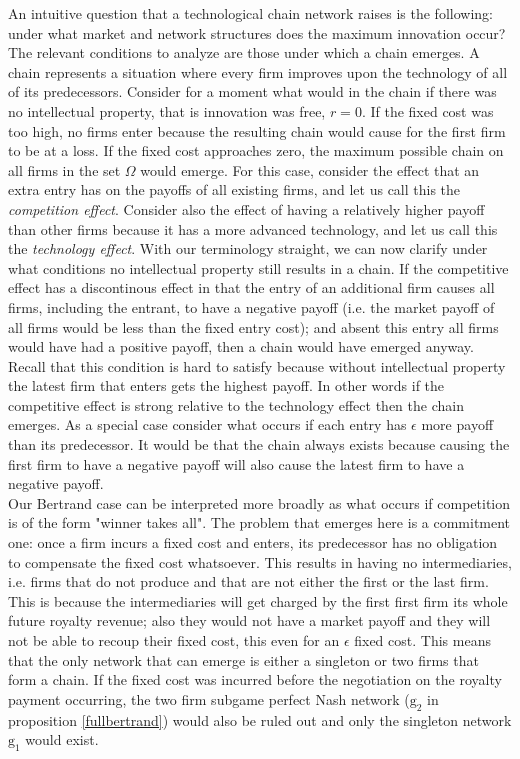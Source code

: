 \documentclass{article}
\begin{document}
\indent An intuitive question that a technological chain network raises is the following: under what market and network structures does the maximum innovation occur? The relevant conditions to analyze are those under which a chain emerges. A chain represents a situation where every firm improves upon the technology of all of its predecessors. Consider for a moment what would in the chain if there was no intellectual property, that is innovation was free, $r=0$. If the fixed cost was too high, no firms enter because the resulting chain would cause for the first firm to be at a loss. If the fixed cost approaches zero, the maximum possible chain on all firms in the set $\Omega$ would emerge. For this case, consider the effect that an extra entry has on the payoffs of all existing firms, and let us call this the \textit{competition effect}. Consider also the effect of having a relatively higher payoff than other firms because it has a more advanced technology, and let us call this the \textit{technology effect}. With our terminology straight, we can now clarify under what conditions no intellectual property still results in a chain. If the competitive effect has a discontinous effect in that the entry of an additional firm causes all firms, including the entrant, to have a negative payoff (i.e. the market payoff of all firms would be less than the fixed entry cost); and absent this entry all firms would have had a positive payoff, then a chain would have emerged anyway. Recall that this condition is hard to satisfy because without intellectual property the latest firm that enters gets the highest payoff. In other words if the competitive effect is strong relative to the technology effect then the chain emerges. As a special case consider what occurs if each entry has $\epsilon$ more payoff than its predecessor. It would be that the chain always exists because causing the first firm to have a negative payoff will also cause the latest firm to have a negative payoff. \\
\indent Our Bertrand case can be interpreted more broadly as what occurs if competition is of the form "winner takes all". The problem that emerges here is a commitment one: once a firm incurs a fixed cost and enters, its predecessor has no obligation to compensate the fixed cost whatsoever. This results in having no intermediaries, i.e. firms that do not produce and that are not either the first or the last firm. This is because the intermediaries will get charged by the first first firm its whole future royalty revenue; also they would not have a market payoff and they will not be able to recoup their fixed cost, this even for an $\epsilon$ fixed cost. This means that the only network that can emerge is either a singleton or two firms that form a chain. If the fixed cost was incurred before the negotiation on the royalty payment occurring, the two firm subgame perfect Nash network ($\text{g}_2$ in proposition \ref{fullbertrand}) would also be ruled out and only the singleton network $\text{g}_1$ would exist. 


\end{document}
